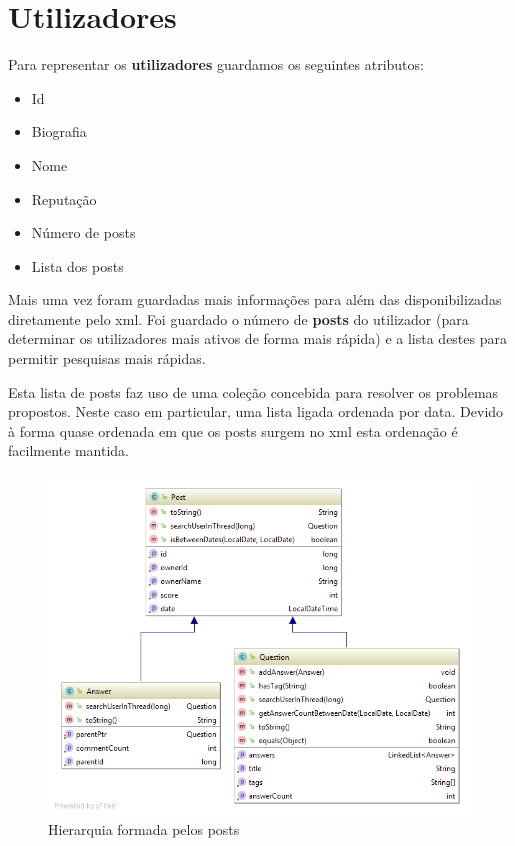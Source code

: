 \documentclass[10pt,a4paper]{report}
\begin{document}
    \section{Utilizadores}
    Para representar os \textbf{utilizadores} guardamos os seguintes atributos:
    \begin{multicols}{2}
    \begin{itemize}
        \item Id
        \item Biografia
        \item Nome
        \item Reputação
        \item Número de posts
        \item Lista dos posts
    \end{itemize}
    \end{multicols}
    Mais uma vez foram guardadas mais informações para além das disponibilizadas
    diretamente pelo xml. Foi guardado o número de \textbf{posts} do utilizador
    (para determinar os utilizadores mais ativos de forma mais rápida) e a lista
    destes para permitir pesquisas mais rápidas.

    Esta lista de posts faz uso de uma coleção concebida para resolver os
    problemas propostos. Neste caso em particular, uma lista ligada ordenada
    por data. Devido à forma quase ordenada em que os posts surgem no xml esta
    ordenação é facilmente mantida.


    \begin{figure}[h]
        \centering
        \includegraphics[height=0.4\textheight]{./images/PostHierarchy.png}
        \caption{Hierarquia formada pelos posts}
    \end{figure}
\end{document}
